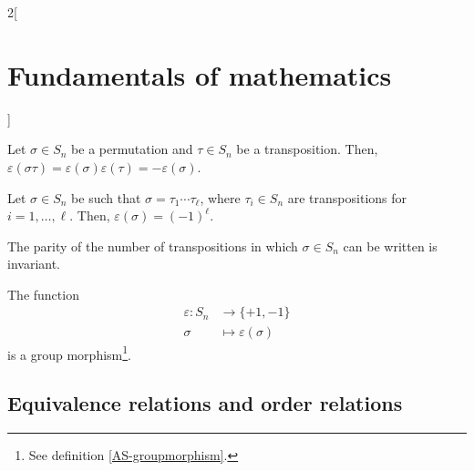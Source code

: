 \documentclass[../../../main.tex]{subfiles}
\begin{document}
\begin{multicols}{2}[\section{Fundamentals of mathematics}]
\begin{theorem}
        Let $\sigma\in S_n$ be a permutation and $\tau\in S_n$ be a transposition. Then, $\varepsilon(\sigma\tau)=\varepsilon(\sigma)\varepsilon(\tau)=-\varepsilon(\sigma)$.
    \end{theorem}
    \begin{corollary}
        Let $\sigma\in S_n$ be such that $\sigma=\tau_1\cdots\tau_\ell$, where $\tau_i\in S_n$ are transpositions for $i=1,\ldots,\ell$. Then, $\varepsilon(\sigma)=(-1)^\ell$.
    \end{corollary}
    \begin{corollary}
        The parity of the number of transpositions in which $\sigma\in S_n$ can be written is invariant.
    \end{corollary}
    \begin{corollary}
        The function
        \begin{align*}
            \varepsilon:S_n & \longrightarrow\{+1,-1\}       \\
            \sigma          & \longmapsto\varepsilon(\sigma)
        \end{align*}
        is a group morphism\footnote{See definition \ref{AS-groupmorphism}.}.
    \end{corollary}
    \subsection{Equivalence relations and order relations}

\end{multicols}
\end{document}

